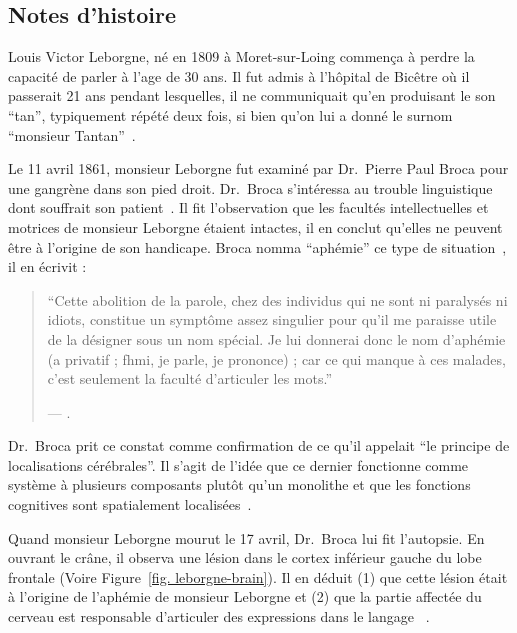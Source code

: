 \subsection{Notes d'histoire}

Louis Victor Leborgne, né en 1809 à Moret-sur-Loing commença à perdre la capacité de parler à l'age de 30 ans.
Il fut admis à l'hôpital de Bicêtre où il passerait 21 ans pendant lesquelles, 
il ne communiquait qu'en produisant le son ``tan'', typiquement répété deux fois, 
si bien qu'on lui a donné le surnom ``monsieur Tantan''~\cite{Mohammed_Narayan_Patra_Nanda_2018}.

Le 11 avril 1861, monsieur Leborgne fut examiné par Dr.~Pierre Paul Broca pour une gangrène dans son pied droit.
Dr.~Broca s'intéressa au trouble linguistique dont souffrait son patient~\cite{Lorch_2011}.
Il fit l'observation que les facultés intellectuelles et motrices de monsieur Leborgne étaient intactes,
il en conclut qu'elles ne peuvent être à l'origine de son handicape. 
Broca nomma ``aphémie'' ce type de situation~\cite{Broca}, il en écrivit :

\begin{quotation}
    ``Cette abolition de la parole, chez des individus qui ne sont ni paralysés ni idiots, constitue un symptôme assez singulier pour qu'il me paraisse utile de la désigner sous un nom spécial. Je lui donnerai donc le nom d'aphémie (\textgreek{a} privatif ; \textgreek{fhmi}, je parle, je prononce) ; car ce qui manque à ces malades, c'est seulement la faculté d'articuler les mots.''
    \begin{flushright}
        \rm --- \cite{Broca}.
    \end{flushright}
\end{quotation}

Dr.~Broca prit ce constat comme confirmation de ce qu'il appelait 
``le principe de localisations cérébrales''.
Il s'agit de l'idée que ce dernier fonctionne comme système à plusieurs composants plutôt qu'un monolithe
et que les fonctions cognitives sont spatialement localisées~\cite{Fodor_1983}.

Quand monsieur Leborgne mourut le 17 avril, Dr.~Broca lui fit l'autopsie.
En ouvrant le crâne, il observa une lésion dans le cortex inférieur gauche du lobe frontale 
(Voire Figure~\ref{fig. leborgne-brain}).
Il en déduit (1) que cette lésion était à l'origine de l'aphémie de monsieur Leborgne et 
(2) que la partie affectée du cerveau est responsable d'articuler des expressions dans le langage
~\cite{Broca,Lorch_2011,Mohammed_Narayan_Patra_Nanda_2018}.

